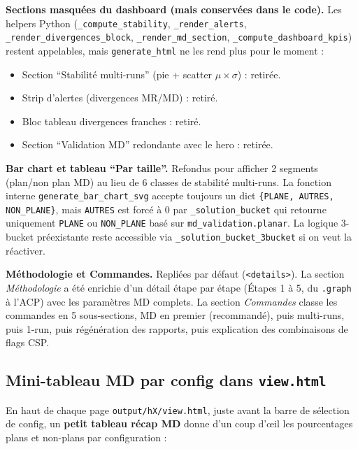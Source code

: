 \textbf{Sections masquées du dashboard (mais conservées dans le code).}
Les helpers Python (\texttt{\_compute\_stability}, \texttt{\_render\_alerts},
\texttt{\_render\_divergences\_block}, \texttt{\_render\_md\_section},
\texttt{\_compute\_dashboard\_kpis}) restent appelables, mais
\texttt{generate\_html} ne les rend plus pour le moment :

\begin{itemize}
  \item Section ``Stabilité multi-runs'' (pie + scatter $\mu \times \sigma$) : retirée.
  \item Strip d'alertes (divergences MR/MD) : retiré.
  \item Bloc tableau divergences franches : retiré.
  \item Section ``Validation MD'' redondante avec le hero : retirée.
\end{itemize}

\textbf{Bar chart et tableau ``Par taille''.} Refondus pour afficher 2 segments
(plan/non plan MD) au lieu de 6 classes de stabilité multi-runs. La fonction interne
\texttt{generate\_bar\_chart\_svg} accepte toujours un dict \texttt{\{PLANE, AUTRES, NON\_PLANE\}},
mais \texttt{AUTRES} est forcé à 0 par \texttt{\_solution\_bucket} qui retourne
uniquement \texttt{PLANE} ou \texttt{NON\_PLANE} basé sur \texttt{md\_validation.planar}.
La logique 3-bucket préexistante reste accessible via \texttt{\_solution\_bucket\_3bucket}
si on veut la réactiver.

\textbf{Méthodologie et Commandes.} Repliées par défaut (\texttt{<details>}). La section
\textit{Méthodologie} a été enrichie d'un détail étape par étape (Étapes 1 à 5, du
\texttt{.graph} à l'ACP) avec les paramètres MD complets. La section \textit{Commandes}
classe les commandes en 5 sous-sections, MD en premier (recommandé), puis multi-runs,
puis 1-run, puis régénération des rapports, puis explication des combinaisons de flags CSP.

\subsection{Mini-tableau MD par config dans \texttt{view.html}}


En haut de chaque page \texttt{output/hX/view.html}, juste avant la barre de sélection de
config, un \textbf{petit tableau récap MD} donne d'un coup d'\oe{}il les pourcentages plans
et non-plans par configuration :

